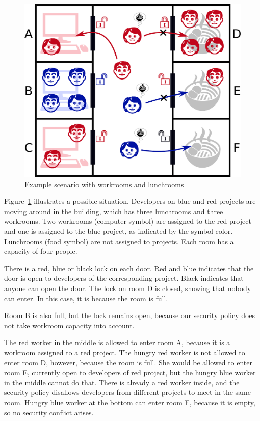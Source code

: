 \begin{figure}[t]
    \centering
    \includegraphics[width=1\linewidth]{img/lunch-rules.pdf}
    \caption{Example scenario with workrooms and lunchrooms}
    \label{fig:lunch-rules}
\end{figure}

Figure~\ref{fig:lunch-rules} illustrates a possible situation. Developers on blue and
red projects are moving around in the building, which has three lunchrooms and three
workrooms. Two workrooms (computer symbol) are assigned to the red project and one is
assigned to the blue project, as indicated by the symbol color. Lunchrooms (food symbol)
are not assigned to projects. Each room has a capacity of four people.

There is a red, blue or black lock on each door. Red and blue indicates that the door is
open to developers of the corresponding project. Black indicates that anyone can open
the door. The lock on room D is closed, showing that nobody can enter. In this case, it
is because the room is full.

Room B is also full, but the lock remains open, because our security policy does not
take workroom capacity into account.

The red worker in the middle is allowed to enter room A, because it is a workroom
assigned to a red project. The hungry red worker is not allowed to enter room D,
however, because the room is full. She would be allowed to enter room E, currently open
to developers of red project, but the hungry blue worker in the middle cannot do that.
There is already a red worker inside, and the security policy disallows developers from
different projects to meet in the same room. Hungry blue worker at the bottom can enter
room F, because it is empty, so no security conflict arises.

